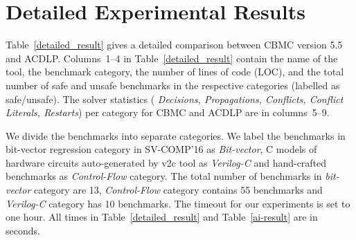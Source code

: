 \appendix
%
\section{Detailed Experimental Results}\label{appendix:extended_result}
Table~\ref{detailed_result} gives a detailed comparison between CBMC version
5.5 and ACDLP.  Columns~1--4 in Table~\ref{detailed_result} contain the
name of the tool, the benchmark category, the number of lines of code (LOC),
and the total number of safe and unsafe benchmarks in the respective
categories (labelled as safe/unsafe).  The solver statistics ({\em
Decisions, Propagations, Conflicts, Conflict Literals, Restarts}) per
category for CBMC and ACDLP are in columns~5--9.
%

We divide the benchmarks into separate categories. 
We label the benchmarks in bit-vector regression category in SV-COMP'16 
as {\em Bit-vector}, C models of hardware circuits auto-generated by v2c 
tool as {\em Verilog-C} and hand-crafted benchmarks as {\em Control-Flow} 
category.  The total number of benchmarks in {\em bit-vector} category are 13, 
{\em Control-Flow} category contains 55 benchmarks and 
{\em Verilog-C} category has 10 benchmarks. The timeout for our
experiments is set to one hour.  All times in Table~\ref{detailed_result} 
and Table~\ref{ai-result} are in seconds. 

